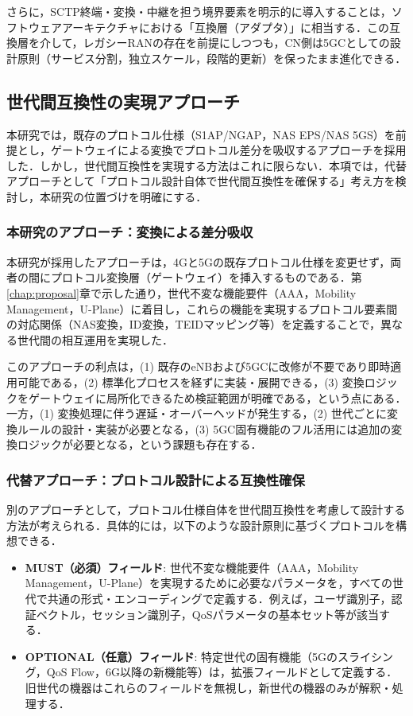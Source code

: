 さらに，SCTP終端・変換・中継を担う境界要素を明示的に導入することは，ソフトウェアアーキテクチャにおける「互換層（アダプタ）」に相当する．この互換層を介して，レガシーRANの存在を前提にしつつも，CN側は5GCとしての設計原則（サービス分割，独立スケール，段階的更新）を保ったまま進化できる．

\subsection{世代間互換性の実現アプローチ}
本研究では，既存のプロトコル仕様（S1AP/NGAP，NAS EPS/NAS 5GS）を前提とし，ゲートウェイによる変換でプロトコル差分を吸収するアプローチを採用した．しかし，世代間互換性を実現する方法はこれに限らない．本項では，代替アプローチとして「プロトコル設計自体で世代間互換性を確保する」考え方を検討し，本研究の位置づけを明確にする．

\subsubsection{本研究のアプローチ：変換による差分吸収}
本研究が採用したアプローチは，4Gと5Gの既存プロトコル仕様を変更せず，両者の間にプロトコル変換層（ゲートウェイ）を挿入するものである．第\ref{chap:proposal}章で示した通り，世代不変な機能要件（AAA，Mobility Management，U-Plane）に着目し，これらの機能を実現するプロトコル要素間の対応関係（NAS変換，ID変換，TEIDマッピング等）を定義することで，異なる世代間の相互運用を実現した．

このアプローチの利点は，(1) 既存のeNBおよび5GCに改修が不要であり即時適用可能である，(2) 標準化プロセスを経ずに実装・展開できる，(3) 変換ロジックをゲートウェイに局所化できるため検証範囲が明確である，という点にある．一方，(1) 変換処理に伴う遅延・オーバーヘッドが発生する，(2) 世代ごとに変換ルールの設計・実装が必要となる，(3) 5GC固有機能のフル活用には追加の変換ロジックが必要となる，という課題も存在する．

\subsubsection{代替アプローチ：プロトコル設計による互換性確保}
別のアプローチとして，プロトコル仕様自体を世代間互換性を考慮して設計する方法が考えられる．具体的には，以下のような設計原則に基づくプロトコルを構想できる．

\begin{itemize}
    \item \textbf{MUST（必須）フィールド}: 世代不変な機能要件（AAA，Mobility Management，U-Plane）を実現するために必要なパラメータを，すべての世代で共通の形式・エンコーディングで定義する．例えば，ユーザ識別子，認証ベクトル，セッション識別子，QoSパラメータの基本セット等が該当する．
    \item \textbf{OPTIONAL（任意）フィールド}: 特定世代の固有機能（5Gのスライシング，QoS Flow，6G以降の新機能等）は，拡張フィールドとして定義する．旧世代の機器はこれらのフィールドを無視し，新世代の機器のみが解釈・処理する．
\end{itemize}

